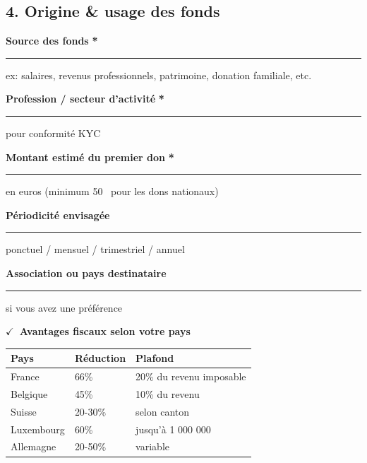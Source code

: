 \documentclass[12pt, a4paper]{article}
\newcommand{\cmark}{\textcolor{ethicGold}{\textbf{$\checkmark$}}}
\newcommand{\required}{\textcolor{redalert}{\textbf{*}}}
\newcommand{\euro}{\texteuro}
\newcommand{\formfield}[2][]{%
    \par\noindent
    \begin{minipage}[t]{0.3\textwidth}
        \textbf{#2} \required
    \end{minipage}%
    \begin{minipage}[t]{0.68\textwidth}
        \rule{\linewidth}{0.4pt}%
        \ifblank{#1}{}{%
            \vspace{0.1cm}\newline
            {\tiny \textcolor{ethicGreenLight}{#1}}%
        }%
    \end{minipage}%
    \par\vspace{0.2cm}%
}
\newcommand{\formfieldOpt}[2][]{%
    \par\noindent
    \begin{minipage}[t]{0.3\textwidth}
        \textbf{#2}
    \end{minipage}%
    \begin{minipage}[t]{0.68\textwidth}
        \rule{\linewidth}{0.4pt}%
        \ifblank{#1}{}{%
            \vspace{0.1cm}\newline
            {\tiny \textcolor{ethicGreenLight}{#1}}%
        }%
    \end{minipage}%
    \par\vspace{0.2cm}%
}
\begin{document}
\vspace{0.5cm}

\begin{sectionbox}
    \subsection*{4.  Origine \& usage des fonds}
    
    \formfield{Source des fonds}{ex: salaires, revenus professionnels, patrimoine, donation familiale, etc.}
    \formfield{Profession / secteur d'activité}{pour conformité KYC}
    \formfield{Montant estimé du premier don}{en euros (minimum 50 \euro\ pour les dons nationaux)}
    \formfieldOpt{Périodicité envisagée}{ponctuel / mensuel / trimestriel / annuel}
    \formfieldOpt{Association ou pays destinataire}{si vous avez une préférence}
    
    \vspace{0.3cm}
    \begin{infobox}
        \centering
        \textbf{\cmark\ Avantages fiscaux selon votre pays} \\
        \vspace{0.2cm}
        \begin{tabular}{@{}lll@{}}
            \toprule
            \textbf{Pays} & \textbf{Réduction} & \textbf{Plafond} \\
            \midrule
            France & 66\% & 20\% du revenu imposable \\
            Belgique & 45\% & 10\% du revenu \\
            Suisse & 20-30\% & selon canton \\
            Luxembourg & 60\% & jusqu'à 1 000 000 \euro \\
            Allemagne & 20-50\% & variable \\
            \bottomrule
        \end{tabular}
    \end{infobox}
\end{sectionbox}

\vspace{0.5cm}
\end{document}
